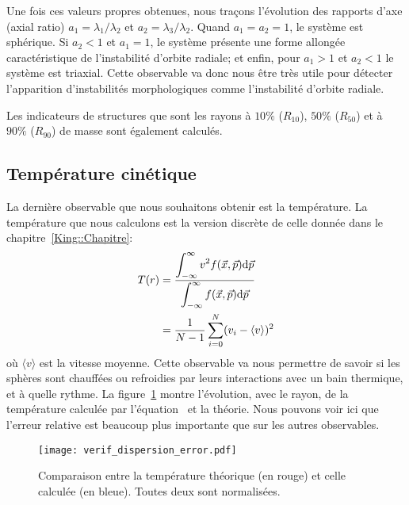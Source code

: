 			Une fois ces valeurs propres obtenues, nous traçons l'évolution des rapports d'axe (\og{}axial ratio\fg)
			$a_1 = \lambda_1 / \lambda_2$ et $a_2 = \lambda_3 / \lambda_2$. Quand $a_1 = a_2 = 1$, le
			système est sphérique. Si $a_2 < 1$ et $a_1 = 1$, le système présente une forme allongée
			caractéristique de l'instabilité d'orbite radiale; et enfin, pour $a_1 >
			1$ et $a_2 < 1$ le système est triaxial. Cette observable va donc nous être très utile pour
			détecter l'apparition d'instabilités morphologiques comme l'instabilité d'orbite radiale.

			Les indicateurs de structures que sont les rayons à $10\%$ ($R_{10}$), $50\%$ ($R_{50}$) et à $90\%$ ($R_{90}$) de masse sont
			également calculés.

		\subsection{Température cinétique}

			La dernière observable que nous souhaitons obtenir est la température. La température que nous
			calculons est la version discrète de celle donnée dans le chapitre~\ref{King::Chapitre}:
			\begin{align}
				T(r) &= \dfrac{\displaystyle\int_{-\infty}^{\infty}v^2 f(\vec{x}, \vec{p})\mathrm{d}\vec{p}}{\displaystyle\int_{-\infty}^{\infty}f(\vec{x}, \vec{p})\mathrm{d}\vec{p}} \notag \\
				     &= \dfrac{1}{N-1}\sum_{i=0}^N (v_i - \langle v\rangle)^2 \label{Eq::Temp::Approx}
			\end{align}
			où $\langle v\rangle$ est la vitesse moyenne.
			Cette observable va nous permettre de savoir si les sphères sont chauffées ou refroidies par leurs
			interactions avec un bain thermique, et à quelle rythme. La figure~\ref{Fig::Comp::Temp} montre l'évolution, avec le rayon, de
			la température calculée par l'équation~ et la théorie. Nous pouvons voir ici que l'erreur relative est
			beaucoup plus importante que sur les autres observables.
			\begin{figure}[htbp]
				\centering \texttt{[image: verif\_dispersion\_error.pdf]}
				\caption{Comparaison entre la température théorique (en rouge) et celle calculée (en bleue). Toutes deux sont
				normalisées.\label{Fig::Comp::Temp}}
			\end{figure}

